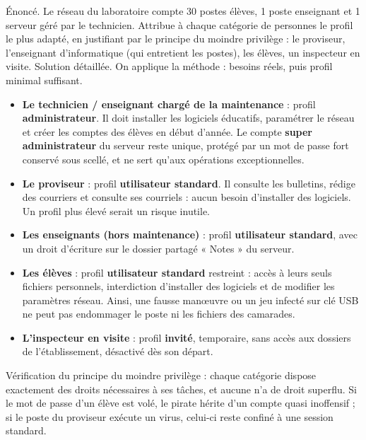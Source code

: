 \documentclass[11pt]{article}
\begin{document}
\begin{exoresolu}
Énoncé. Le réseau du laboratoire compte 30 postes élèves, 1 poste enseignant et 1 serveur géré par le technicien. Attribue à chaque catégorie de personnes le profil le plus adapté, en justifiant par le principe du moindre privilège : le proviseur, l'enseignant d'informatique (qui entretient les postes), les élèves, un inspecteur en visite.
\tcblower
Solution détaillée. On applique la méthode : besoins réels, puis profil minimal suffisant.
\begin{itemize}
  \item \textbf{Le technicien / enseignant chargé de la maintenance} : profil \textbf{administrateur}. Il doit installer les logiciels éducatifs, paramétrer le réseau et créer les comptes des élèves en début d'année. Le compte \textbf{super administrateur} du serveur reste unique, protégé par un mot de passe fort conservé sous scellé, et ne sert qu'aux opérations exceptionnelles.
  \item \textbf{Le proviseur} : profil \textbf{utilisateur standard}. Il consulte les bulletins, rédige des courriers et consulte ses courriels : aucun besoin d'installer des logiciels. Un profil plus élevé serait un risque inutile.
  \item \textbf{Les enseignants (hors maintenance)} : profil \textbf{utilisateur standard}, avec un droit d'écriture sur le dossier partagé « Notes » du serveur.
  \item \textbf{Les élèves} : profil \textbf{utilisateur standard} restreint : accès à leurs seuls fichiers personnels, interdiction d'installer des logiciels et de modifier les paramètres réseau. Ainsi, une fausse manœuvre ou un jeu infecté sur clé USB ne peut pas endommager le poste ni les fichiers des camarades.
  \item \textbf{L'inspecteur en visite} : profil \textbf{invité}, temporaire, sans accès aux dossiers de l'établissement, désactivé dès son départ.
\end{itemize}
Vérification du principe du moindre privilège : chaque catégorie dispose exactement des droits nécessaires à ses tâches, et aucune n'a de droit superflu. Si le mot de passe d'un élève est volé, le pirate hérite d'un compte quasi inoffensif ; si le poste du proviseur exécute un virus, celui-ci reste confiné à une session standard.
\end{exoresolu}
\end{document}
